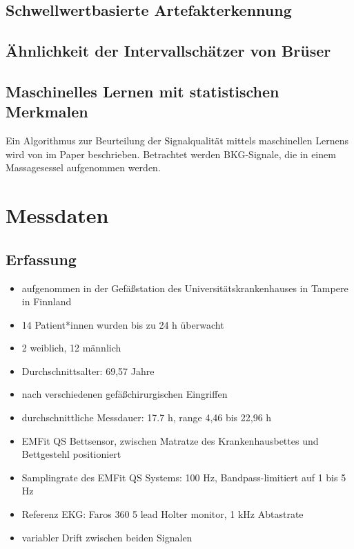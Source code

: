 	\subsection{Schwellwertbasierte Artefakterkennung}
	
	\subsection{Ähnlichkeit der Intervallschätzer von Brüser}
	
	\subsection{Maschinelles Lernen mit statistischen Merkmalen}
	
	Ein Algorithmus zur Beurteilung der Signalqualität mittels maschinellen Lernens wird von \citeauthor{Sadek2016} im Paper  beschrieben. Betrachtet werden \ac{BKG}-Signale, die in einem Massagesessel aufgenommen werden.

\section{Messdaten}
	
	\subsection{Erfassung}
	
	\begin{itemize}
		\item aufgenommen in der Gefäßstation des Universitätskrankenhauses in Tampere in Finnland
		\item 14 Patient*innen wurden bis zu 24 h überwacht
		\item 2 weiblich, 12 männlich
		\item Durchschnittsalter: 69,57 Jahre
		\item nach verschiedenen gefäßchirurgischen Eingriffen
		\item durchschnittliche Messdauer: 17.7 h, range 4,46 bis 22,96 h
		\item EMFit QS Bettsensor, zwischen Matratze des Krankenhausbettes und Bettgestehl positioniert
		\item Samplingrate des EMFit QS Systems: 100 Hz, Bandpass-limitiert auf 1 bis 5 Hz
		\item Referenz EKG: Faros 360 5 lead Holter monitor, 1 kHz Abtastrate
		\item variabler Drift zwischen beiden Signalen %
	\end{itemize}
	
